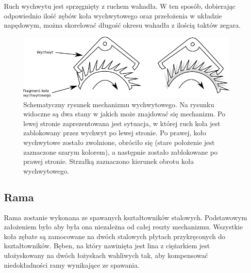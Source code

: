             Ruch wychwytu jest sprzęgnięty z ruchem wahadła. W ten sposób, dobierając odpowiednio ilość zębów koła wychwytowego oraz przełożenia w układzie napędowym, można skorelować długość okresu wahadła z ilością taktów zegara.
            
            \begin{figure}[b]
            \centering
            \includegraphics[width=0.9\linewidth]{Obliczenia/wychwyt}
            \caption{Schematyczny rysunek mechanizmu wychwytowego. Na rysunku widoczne są dwa stany w jakich może znajdować się mechanizm. Po lewej stronie zaprezentowana jest sytuacja, w której ruch koła jest zablokowany przez wychwyt po lewej stronie. Po prawej, koło wychwytowe zostało zwolnione, obróciło się (stare położenie jest zaznaczone szarym kolorem), a następnie zostało zablokowane po prawej stronie. Strzałką zaznaczono kierunek obrotu koła wychwytowego.} 
            \label{fig::wychwyt}
            \end{figure}


        \subsection{Rama}
        	Rama zostanie wykonana ze spawanych kształtowników stalowych. Podstawowym założeniem było aby była ona niezależna od całej reszty mechanizmu. Wszystkie koła zębate są zamocowane na dwóch stalowych płytach przykręconych do kształtowników. Bęben, na który nawinięta jest lina z ciężarkiem jest ułożyskowany na dwóch łożyskach wahliwych tak, aby kompensować niedokładności ramy wynikające ze spawania.
        
